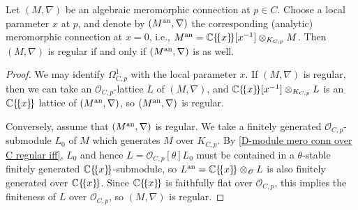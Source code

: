 \begin{lemma}\label{D-module mero conn over curve regular iff analytic}
Let $(M,\nabla)$ be an algebraic meromorphic connection at $p\in C$. Choose a local parameter $x$ at $p$, and denote by $(M^{\mathrm{an}},\nabla)$ the corresponding (analytic) meromorphic connection at $x=0$, i.e., $M^{\mathrm{an}}=\mathbb{C}\{\!\{x\}\!\}[x^{-1}]\otimes_{K_{C,p}}M$. Then $(M,\nabla)$ is regular if and only if $(M^{\mathrm{an}},\nabla)$ is as well.
\end{lemma}
\begin{proof}
We may identify $\Omega_{C,p}^1$ with the local parameter $x$. If $(M,\nabla)$ is regular, then we can take an $\mathscr{O}_{C,p}$-lattice $L$ of $(M,\nabla)$, and $\mathbb{C}\{\!\{x\}\!\}[x^{-1}]\otimes_{K_{C,p}}L$ is an $\mathbb{C}\{\!\{x\}\!\}$ lattice of $(M^{\mathrm{an}},\nabla)$, so $(M^{\mathrm{an}},\nabla)$ is regular.\par
Conversely, assume that $(M^{\mathrm{an}},\nabla)$ is regular. We take a finitely generated $\mathscr{O}_{C,p}$-submodule $L_0$ of $M$ which generates $M$ over $K_{C,p}$. By \cref{D-module mero conn over C regular iff}, $L_0$ and hence $L=\mathscr{O}_{C,p}[\theta]L_0$ must be contained in a $\theta$-stable finitely generated $\mathbb{C}\{\!\{x\}\!\}$-submodule, so $L^{\mathrm{an}}=\mathbb{C}\{\!\{x\}\!\}\otimes_{\mathscr{O}}L$ is also finitely generated over $\mathbb{C}\{\!\{x\}\!\}$. Since $\mathbb{C}\{\!\{x\}\!\}$ is faithfully flat over $\mathscr{O}_{C,p}$, this implies the finiteness of $L$ over $\mathscr{O}_{C,p}$, so $(M,\nabla)$ is regular.
\end{proof}

